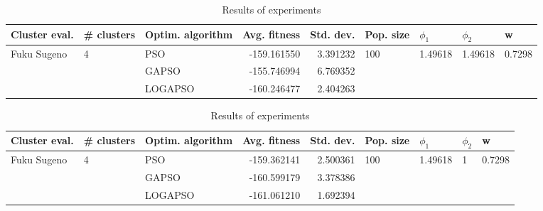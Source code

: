 \documentclass{article}
\begin{document}
\begin{table}
\centering
\caption{Results of experiments}
\begin{tabular}{lllrrllll}
\toprule
               Cluster eval. &        \# clusters & Optim. algorithm &  Avg. fitness &  Std. dev. &            Pop. size &               $\phi_{1}$ &               $\phi_{2}$ &                       w \\
\midrule
\multirow{3}{*}{Fuku Sugeno} & \multirow{3}{*}{4} &              PSO &   -159.161550 &   3.391232 & \multirow{3}{*}{100} & \multirow{3}{*}{1.49618} & \multirow{3}{*}{1.49618} & \multirow{3}{*}{0.7298} \\
                             &                    &            GAPSO &   -155.746994 &   6.769352 &                      &                          &                          &                         \\
                             &                    &          LOGAPSO &   -160.246477 &   2.404263 &                      &                          &                          &                         \\
\bottomrule
\end{tabular}
\end{table}
\begin{table}
\centering
\caption{Results of experiments}
\begin{tabular}{lllrrllll}
\toprule
               Cluster eval. &        \# clusters & Optim. algorithm &  Avg. fitness &  Std. dev. &            Pop. size &               $\phi_{1}$ &         $\phi_{2}$ &                       w \\
\midrule
\multirow{3}{*}{Fuku Sugeno} & \multirow{3}{*}{4} &              PSO &   -159.362141 &   2.500361 & \multirow{3}{*}{100} & \multirow{3}{*}{1.49618} & \multirow{3}{*}{1} & \multirow{3}{*}{0.7298} \\
                             &                    &            GAPSO &   -160.599179 &   3.378386 &                      &                          &                    &                         \\
                             &                    &          LOGAPSO &   -161.061210 &   1.692394 &                      &                          &                    &                         \\
\bottomrule
\end{tabular}
\end{table}
\end{document}
